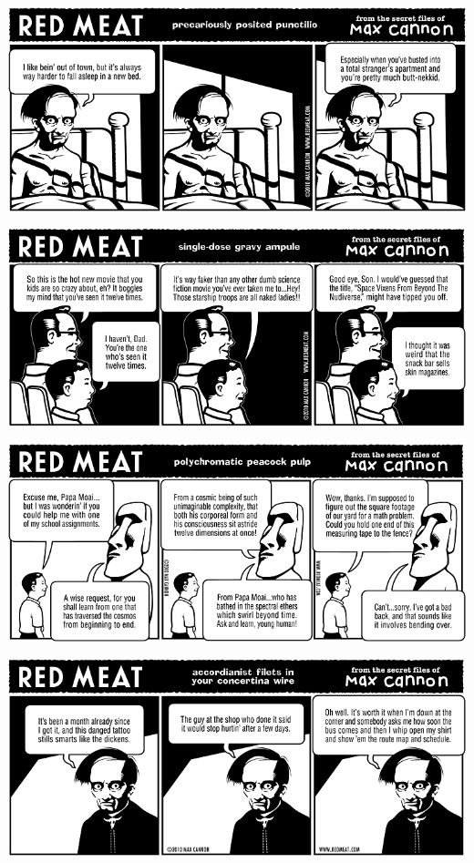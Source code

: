 \documentclass[a4paper,twoside,11pt]{article}
\begin{document}
\includegraphics[width=\textwidth]{redmeat_2010-06-01.png}



\includegraphics[width=\textwidth]{redmeat_2010-06-08.png}



\includegraphics[width=\textwidth]{redmeat_2010-06-15.png}



\includegraphics[width=\textwidth]{redmeat_2010-06-22.png}
\end{document}
